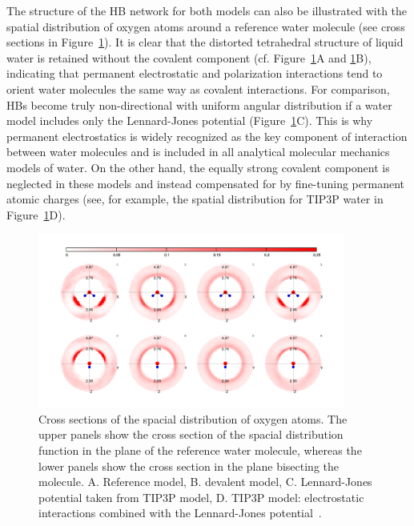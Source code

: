 \documentclass[journal=jacsat,manuscript=article]{achemso}
\begin{document}
The structure of the HB network for both models can also be illustrated with the spatial distribution of oxygen atoms around a reference water molecule (see cross sections in Figure~\ref{Fig:SDF}). 
It is clear that the distorted tetrahedral structure of liquid water is retained without the covalent component (cf. Figure~\ref{Fig:SDF}A and \ref{Fig:SDF}B), indicating that permanent electrostatic and polarization interactions tend to orient water molecules the same way as covalent interactions. 
For comparison, HBs become truly non-directional with uniform angular distribution if a water model includes only the Lennard-Jones potential (Figure~\ref{Fig:SDF}C). %
This is why permanent electrostatics is widely recognized as the key component of interaction between water molecules and is included in all analytical molecular mechanics models of water. 
On the other hand, the equally strong covalent component is neglected in these models and instead compensated for by fine-tuning permanent atomic charges (see, for example, the spatial distribution for TIP3P water in Figure~\ref{Fig:SDF}D). 

\begin{figure}
\includegraphics[width=0.9\textwidth]{SDF}
\caption{Cross sections of the spacial distribution of oxygen atoms. 
The upper panels show the cross section of the spacial distribution function in the plane of the reference water molecule, whereas the lower panels show the cross section in the plane bisecting the molecule. 
A. Reference model, B. devalent model, C. Lennard-Jones potential taken from TIP3P model, D. TIP3P model: electrostatic interactions combined with the Lennard-Jones potential~\cite{TIP3P}.} \label{Fig:SDF}
\end{figure}
 
\end{document}
